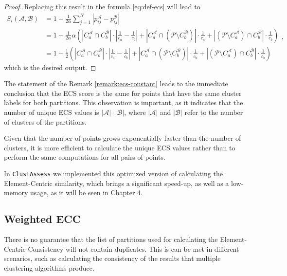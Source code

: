 \begin{proof}
    Replacing this result in the formula \ref{eq:def-ecs} will lead to
    \[
    \begin{aligned}
        S_i (\mathcal{A}, \mathcal{B}) &= 1 - \frac{1}{2 \alpha} \sum_{j = 1}^N |p_{ij}^{\mathcal{A}} - p_{ij}^{\mathcal{B}} |  \\
        &= 1 - \frac{1}{2\alpha}\alpha\left( |C_a^\mathcal{A} \cap C_b^\mathcal{B}|\cdot \left|\frac{1}{c_a} - \frac{1}{c_b}\right| + |C_a^\mathcal{A} \cap (\mathcal{P} \setminus C_b^{\mathcal{B}})| \cdot \frac{1}{c_a} + |(\mathcal{P} \setminus C_a^\mathcal{A}) \cap C_b^\mathcal{B}|\cdot \frac{1}{c_b} \right) \\
        &= 1 - \frac{1}{2}\left( |C_a^\mathcal{A} \cap C_b^\mathcal{B}|\cdot \left|\frac{1}{c_a} - \frac{1}{c_b}\right| + |C_a^\mathcal{A} \cap (\mathcal{P} \setminus C_b^{\mathcal{B}})| \cdot \frac{1}{c_a} + |(\mathcal{P} \setminus C_a^\mathcal{A}) \cap C_b^\mathcal{B}|\cdot \frac{1}{c_b} \right)
    \end{aligned} ,
    \]
    which is the desired output.
\end{proof}

The statement of the Remark \ref{remark:ecs-constant} leads to the immediate conclusion that the ECS score is the same for points that have the same cluster labels for both partitions. This observation is important, as it indicates that the number of unique ECS values is $|\mathcal{A}| \cdot |\mathcal{B}|$, where $|\mathcal{A}|$ and $|\mathcal{B}|$ refer to the number of clusters of the partitions.

Given that the number of points grows exponentially faster than the number of clusters, it is more efficient to calculate the unique ECS values rather than to perform the same computations for all pairs of points.

In \verb|ClustAssess| we implemented this optimized version of calculating the Element-Centric similarity, which brings a significant speed-up, as well as a low-memory usage, as it will be seen in Chapter 4.

\subsection{Weighted ECC}
There is no guarantee that the list of partitions used for calculating the Element-Centric Consistency will not contain duplicates. This is can be met in different scenarios, such as calculating the consistency of the results that multiple clustering algorithms produce.

